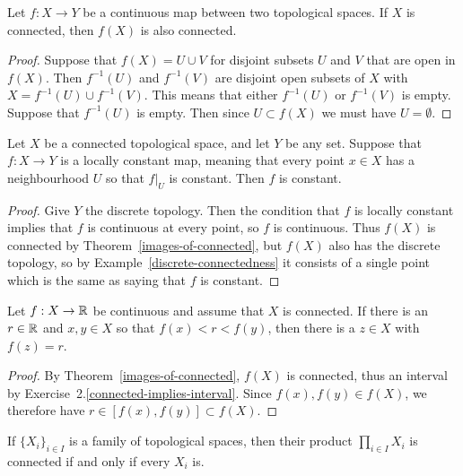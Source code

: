 \begin{thm}
  \label{images-of-connected}
  Let $f : X \to Y$ be a continuous map between two topological spaces. If $X$ is connected, then $f(X)$ is also connected.
\end{thm}
\begin{proof}
  Suppose that $f(X) = U \cup V$ for disjoint subsets $U$ and $V$ that are open in $f(X)$. Then $f^{-1}(U)$ and $f^{-1}(V)$ are disjoint open subsets of $X$ with $X = f^{-1}(U) \cup f^{-1}(V)$. This means that either $f^{-1}(U)$ or $f^{-1}(V)$ is empty. Suppose that $f^{-1}(U)$ is empty. Then since $U \subset f(X)$ we must have $U = \emptyset$.
\end{proof}
\begin{cor}
  Let $X$ be a connected topological space, and let $Y$ be any set. Suppose that $f : X \to Y$ is a locally constant map, meaning that every point $x \in X$ has a neighbourhood $U$ so that $f|_U$ is constant. Then $f$ is constant.
\end{cor}
\begin{proof}
  Give $Y$ the discrete topology. Then the condition that $f$ is locally constant implies that $f$ is continuous at every point, so $f$ is continuous. Thus $f(X)$ is connected by Theorem~\ref{images-of-connected}, but $f(X)$ also has the discrete topology, so by Example~\ref{discrete-connectedness} it consists of a single point which is the same as saying that $f$ is constant.
\end{proof}
\begin{cor}
  Let $f : X \to \mathbb{R}$ be continuous and assume that $X$ is connected. If there is an $r \in \mathbb{R}$ and $x,y \in X$ so that $f(x) < r < f(y)$, then there is a $z \in X$ with $f(z) = r$.
\end{cor}
\begin{proof}
  By Theorem~\ref{images-of-connected}, $f(X)$ is connected, thus an interval by Exercise~2.\ref{connected-implies-interval}. Since $f(x),f(y) \in f(X)$, we therefore have $r \in [f(x),f(y)] \subset f(X)$.
\end{proof}
\begin{thm}
  \label{products-connected}
  If $\{X_i\}_{i \in I}$ is a family of topological spaces, then their product $\prod_{i \in I} X_i$ is connected if and only if every $X_i$ is.
\end{thm}
